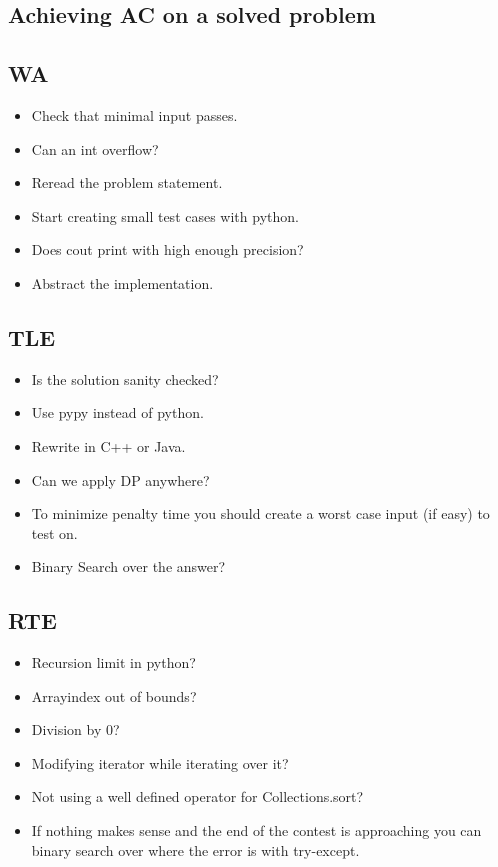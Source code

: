 \documentclass[8pt,a4paper,landscape,oneside]{amsart}
\begin{document}
\begin{multicols*}{2}
\begin{large}
\section{Achieving AC on a solved problem}
    \subsection{WA}
        \begin{itemize}
        \item Check that minimal input passes.
        \item Can an int overflow?
        \item Reread the problem statement.
        \item Start creating small test cases with python.
        \item Does cout print with high enough precision?
        \item Abstract the implementation.
        \end{itemize}
    \subsection{TLE}
        \begin{itemize}
        \item Is the solution sanity checked?
        \item Use pypy instead of python.
        \item Rewrite in C++ or Java.
        \item Can we apply DP anywhere?
        \item To minimize penalty time you should create a worst case input (if easy) to test on.
        \item Binary Search over the answer?
        \end{itemize}
    \subsection{RTE}
        \begin{itemize}
        \item Recursion limit in python?
        \item Arrayindex out of bounds?
        \item Division by $0$?
        \item Modifying iterator while iterating over it?
        \item Not using a well defined operator for Collections.sort?
        \item If nothing makes sense and the end of the contest is approaching you
            can binary search over where the error is with try-except.
        \end{itemize}

\end{large}
\end{multicols*}
\end{document}
